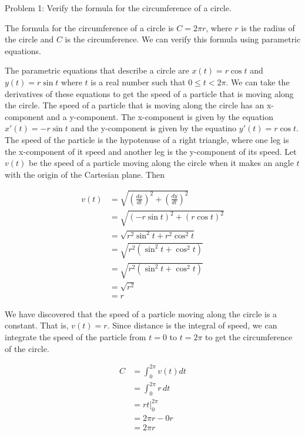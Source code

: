 Problem 1: Verify the formula for the circumference of a circle.

The formula for the circumference of a circle is $C = 2\pi r$, where $r$ is the radius of the circle and $C$ is the circumference. We can verify this formula using parametric equations.

The parametric equations that describe a circle are $x(t) = r\cos t$ and $y(t) = r\sin t$ where $t$ is a real number such that $0 \leq t < 2 \pi$. We can take the derivatives of these equations to get the speed of a particle that is moving along the circle. The speed of a particle that is moving along the circle has an x-component and a y-component. The x-component is given by the equation $x'(t) = -r\sin t$ and the y-component is given by the equatino $y'(t) = r\cos t$. The speed of the particle is the hypotenuse of a right triangle, where one leg is the x-component of it speed and another leg is the y-component of its speed. Let $v(t)$ be the speed of a particle moving along the circle when it makes an angle $t$ with the origin of the Cartesian plane. Then

\begin{align*}
v(t) &= \sqrt{\left(\frac{dx}{dt}\right)^2 + \left(\frac{dy}{dt}\right)^2} \\
&= \sqrt{\left(-r\sin t\right)^2 + \left(r\cos t\right)^2} \\
&= \sqrt{r^2\sin^2 t + r^2 \cos^2 t} \\
&= \sqrt{r^2(\sin^2 t + \cos^2 t)} \\
&= \sqrt{r^2(\sin^2 t + \cos^2 t)} \\
&= \sqrt{r^2} \\
&= r
\end{align*}

We have discovered that the speed of a particle moving along the circle is a constant. That is, $v(t) = r$. Since distance is the integral of speed, we can integrate the speed of the particle from $t = 0$ to $t = 2\pi$ to get the circumference of the circle.

\begin{align*}
C &= \int_{0}^{2\pi} v(t) dt \\
&= \int_{0}^{2\pi} r \, dt \\
&= rt \Bigg|_{0}^{2\pi} \\
&= 2\pi r - 0r \\
&= \boxed{2\pi r}
\end{align*}

